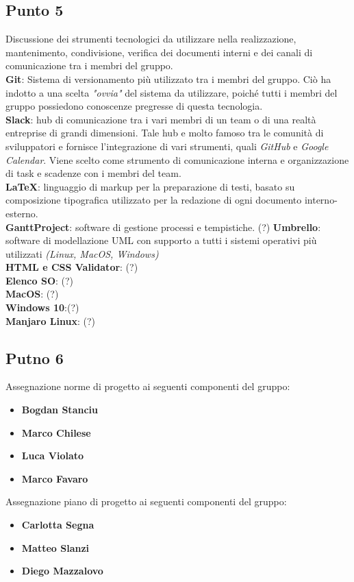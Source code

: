 \subsection{Punto 5}
Discussione dei strumenti tecnologici da utilizzare nella realizzazione,
mantenimento, condivisione, verifica dei documenti interni e dei canali di comunicazione tra i membri del gruppo. \\
\textbf{Git}: Sistema di versionamento più utilizzato tra i membri del gruppo. Ciò ha indotto a una scelta \textit{"ovvia"} del sistema da utilizzare, poiché tutti i membri del gruppo possiedono conoscenze pregresse di questa tecnologia. \\ 
\textbf{Slack}: hub di comunicazione tra i vari membri di un team o di una realtà entreprise di grandi dimensioni. Tale hub e molto famoso tra le comunità di sviluppatori e fornisce l'integrazione di vari strumenti, quali \textit{GitHub} e \textit{Google Calendar}. Viene scelto come strumento di comunicazione interna e organizzazione di task e scadenze con i membri del team. \\
\textbf{LaTeX}: linguaggio di markup per la preparazione di testi, basato su  composizione tipografica utilizzato per la redazione di ogni documento interno-esterno.  \\
\textbf{GanttProject}: software di gestione processi e tempistiche. (?) 
\textbf{Umbrello}: software di modellazione UML con supporto a tutti i sistemi operativi più utilizzati \textit{(Linux, MacOS, Windows)} \\
\textbf{HTML e CSS Validator}: (?)\\
\textbf{Elenco SO}: (?) \\ 
\textbf{MacOS}: (?) \\
\textbf{Windows 10}:(?) \\ 
\textbf{Manjaro Linux}: (?)


\subsection{Putno 6}
Assegnazione norme di progetto ai seguenti componenti del gruppo: 
\begin{itemize}
	\item \textbf{Bogdan Stanciu}
	\item \textbf{Marco Chilese}
	\item \textbf{Luca Violato}
	\item \textbf{Marco Favaro}
\end{itemize} 

Assegnazione piano di progetto ai seguenti componenti del gruppo:
\begin{itemize}
	\item \textbf{Carlotta Segna}
	\item \textbf{Matteo Slanzi}
	\item \textbf{Diego Mazzalovo}
\end{itemize}

